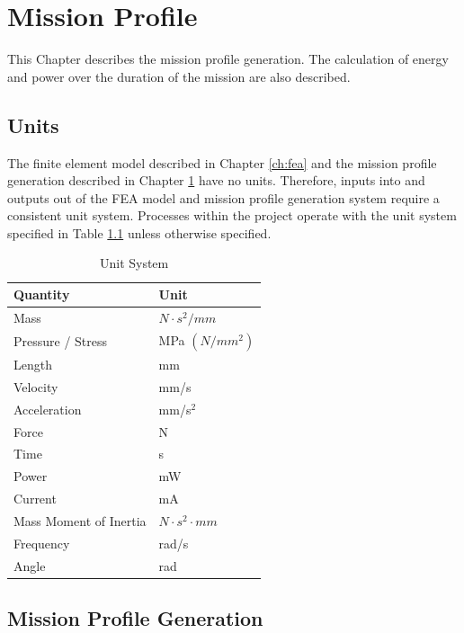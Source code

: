\documentclass[doublespace,nopageskip]{VTthesis}
\begin{document}
		
	
	\chapter{Mission Profile} \label{ch:missionprofile}
		This Chapter describes the mission profile generation. The calculation of energy and power over the duration of the mission are also described. 
		
		\section{Units} \label{se:units}
			The finite element model described in Chapter \ref{ch:fea} and the mission profile generation described in Chapter \ref{ch:missionprofile} have no units. Therefore, inputs into and outputs out of the FEA model and mission profile generation system require a consistent unit system. Processes within the project operate with the unit system specified in Table \ref{tab:unit_system} unless otherwise specified. 
			
			\begin{table}[H]
				\centering
				\caption{Unit System}
				\begin{tabular}{ll}
					\hline
					\textbf{Quantity} & \textbf{Unit} \\
					\hline
					Mass & $N \cdot s^{2}/mm$ \\
					Pressure / Stress & MPa $(N/mm^{2})$ \\
					Length & mm \\
					Velocity & mm/s \\
					Acceleration & mm/s$^{2}$ \\
					Force & N \\
					Time & s \\
					Power & mW \\
					Current & mA \\
					Mass Moment of Inertia & $N \cdot s^{2} \cdot mm$ \\
					Frequency & rad/s \\
					Angle & rad \\
					\hline
				\end{tabular}
				\label{tab:unit_system}
			\end{table}
		
		\section{Mission Profile Generation} \label{se:mission_profile}
	
\end{document}

